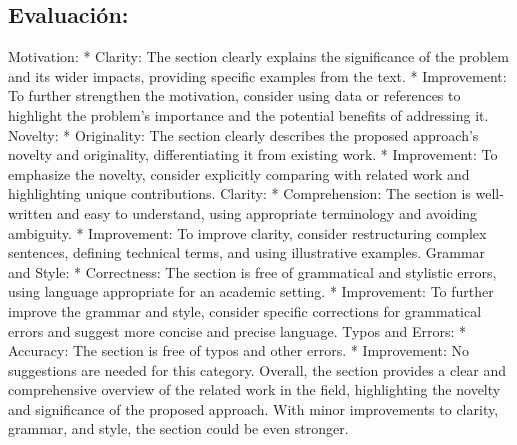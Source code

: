 \documentclass{article}%
\begin{document}
\subsection{Evaluación:}%
\label{subsec:Evaluacin}%
\newline%
Motivation:\newline%
\newline%
* Clarity: The section clearly explains the significance of the problem and its wider impacts, providing specific examples from the text.\newline%
* Improvement: To further strengthen the motivation, consider using data or references to highlight the problem's importance and the potential benefits of addressing it.\newline%
\newline%
Novelty:\newline%
\newline%
* Originality: The section clearly describes the proposed approach's novelty and originality, differentiating it from existing work.\newline%
* Improvement: To emphasize the novelty, consider explicitly comparing with related work and highlighting unique contributions.\newline%
\newline%
Clarity:\newline%
\newline%
* Comprehension: The section is well{-}written and easy to understand, using appropriate terminology and avoiding ambiguity.\newline%
* Improvement: To improve clarity, consider restructuring complex sentences, defining technical terms, and using illustrative examples.\newline%
\newline%
Grammar and Style:\newline%
\newline%
* Correctness: The section is free of grammatical and stylistic errors, using language appropriate for an academic setting.\newline%
* Improvement: To further improve the grammar and style, consider specific corrections for grammatical errors and suggest more concise and precise language.\newline%
\newline%
Typos and Errors:\newline%
\newline%
* Accuracy: The section is free of typos and other errors.\newline%
* Improvement: No suggestions are needed for this category.\newline%
\newline%
Overall, the section provides a clear and comprehensive overview of the related work in the field, highlighting the novelty and significance of the proposed approach. With minor improvements to clarity, grammar, and style, the section could be even stronger.
\end{document}
